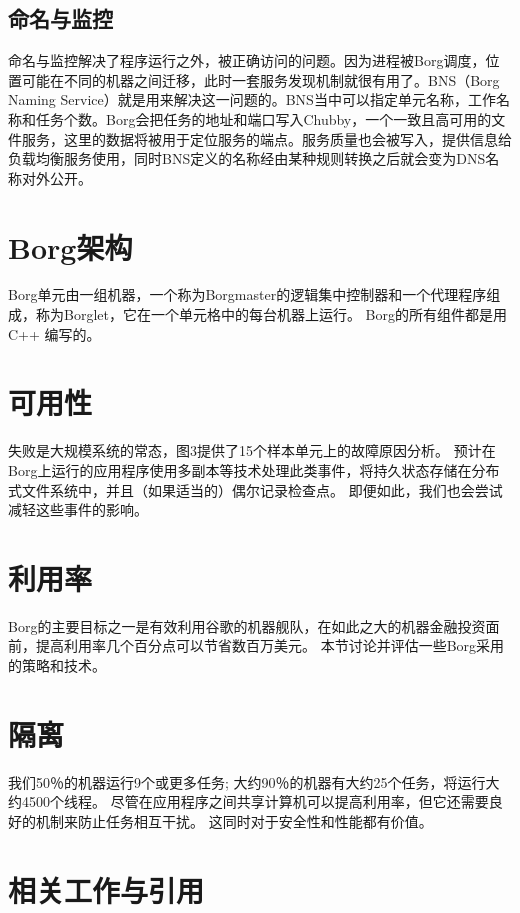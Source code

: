 \subsection{命名与监控}

命名与监控解决了程序运行之外，被正确访问的问题。因为进程被Borg调度，位置可能在不同的机器之间迁移，此时一套服务发现机制就很有用了。BNS（Borg Naming Service）就是用来解决这一问题的。BNS当中可以指定单元名称，工作名称和任务个数。Borg会把任务的地址和端口写入Chubby，一个一致且高可用的文件服务，这里的数据将被用于定位服务的端点。服务质量也会被写入，提供信息给负载均衡服务使用，同时BNS定义的名称经由某种规则转换之后就会变为DNS名称对外公开。

\section{Borg架构}

Borg单元由一组机器，一个称为Borgmaster的逻辑集中控制器和一个代理程序组成，称为Borglet，它在一个单元格中的每台机器上运行。 Borg的所有组件都是用 C++ 编写的。

\section{可用性}

失败是大规模系统的常态，图3提供了15个样本单元上的故障原因分析。 预计在Borg上运行的应用程序使用多副本等技术处理此类事件，将持久状态存储在分布式文件系统中，并且（如果适当的）偶尔记录检查点。 即便如此，我们也会尝试减轻这些事件的影响。

\section{利用率}

Borg的主要目标之一是有效利用谷歌的机器舰队，在如此之大的机器金融投资面前，提高利用率几个百分点可以节省数百万美元。 本节讨论并评估一些Borg采用的策略和技术。

\section{隔离}

我们50％的机器运行9个或更多任务; 大约90％的机器有大约25个任务，将运行大约4500个线程。 尽管在应用程序之间共享计算机可以提高利用率，但它还需要良好的机制来防止任务相互干扰。 这同时对于安全性和性能都有价值。

\section{相关工作与引用}

